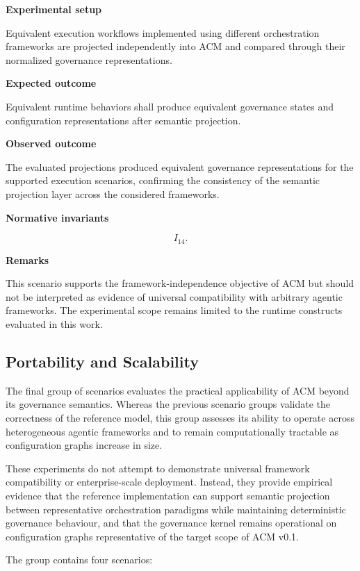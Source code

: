 \documentclass[10pt]{article}
\begin{document}
\textbf{Experimental setup}

Equivalent execution workflows implemented using different orchestration
frameworks are projected independently into ACM and compared through their
normalized governance representations.

\textbf{Expected outcome}

Equivalent runtime behaviors shall produce equivalent governance states and
configuration representations after semantic projection.

\textbf{Observed outcome}

The evaluated projections produced equivalent governance representations for
the supported execution scenarios, confirming the consistency of the semantic
projection layer across the considered frameworks.

\textbf{Normative invariants}

\[
I_{14}.
\]

\textbf{Remarks}

This scenario supports the framework-independence objective of ACM but should
not be interpreted as evidence of universal compatibility with arbitrary
agentic frameworks. The experimental scope remains limited to the runtime
constructs evaluated in this work.

\subsection{Portability and Scalability}
\label{app:scenario_group_e}

The final group of scenarios evaluates the practical applicability of ACM
beyond its governance semantics. Whereas the previous scenario groups validate
the correctness of the reference model, this group assesses its ability to
operate across heterogeneous agentic frameworks and to remain computationally
tractable as configuration graphs increase in size.

These experiments do not attempt to demonstrate universal framework
compatibility or enterprise-scale deployment. Instead, they provide empirical
evidence that the reference implementation can support semantic projection
between representative orchestration paradigms while maintaining deterministic
governance behaviour, and that the governance kernel remains operational on
configuration graphs representative of the target scope of ACM v0.1.

The group contains four scenarios:
\end{document}
